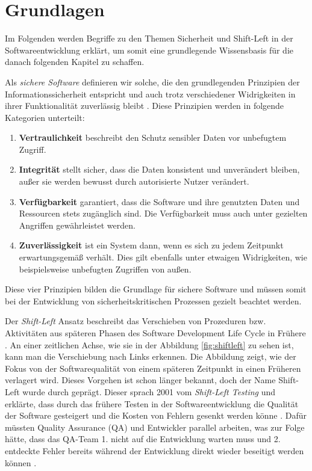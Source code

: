 \section{Grundlagen}

Im Folgenden werden Begriffe zu den Themen Sicherheit und Shift-Left in der Softwareentwicklung erklärt, um somit eine grundlegende Wissensbasis für die danach folgenden Kapitel zu schaffen.

Als \textit{sichere Software} definieren wir solche, die den grundlegenden Prinzipien der Informationssicherheit \cite{blakley_information_2001} entspricht und auch trotz verschiedener Widrigkeiten in ihrer Funktionalität zuverlässig bleibt \cite{oueslati_literature_2015}. Diese Prinzipien werden in folgende Kategorien unterteilt:
\begin{enumerate}
    \item \textbf{Vertraulichkeit} beschreibt den Schutz sensibler Daten vor unbefugtem Zugriff.
    \item \textbf{Integrität} stellt sicher, dass die Daten konsistent und unverändert bleiben, außer sie werden bewusst durch autorisierte Nutzer verändert.
    \item \textbf{Verfügbarkeit} garantiert, dass die Software und ihre genutzten Daten und Ressourcen stets zugänglich sind. Die Verfügbarkeit muss auch unter gezielten Angriffen gewährleistet werden.
    \item \textbf{Zuverlässigkeit} ist ein System dann, wenn es sich zu jedem Zeitpunkt erwartungsgemäß verhält. Dies gilt ebenfalls unter etwaigen Widrigkeiten, wie beispielsweise unbefugten Zugriffen von außen.
\end{enumerate}
Diese vier Prinzipien bilden die Grundlage für sichere Software und müssen somit bei der Entwicklung von sicherheitskritischen Prozessen gezielt beachtet werden.\

Der \textit{Shift-Left} Ansatz beschreibt das Verschieben von Prozeduren bzw. Aktivitäten aus späteren Phasen des Software Development Life Cycle in Frühere \cite{andriadi_impact_2023}. An einer zeitlichen Achse, wie sie in der Abbildung \ref{fig:shiftleft} zu sehen ist, kann man die Verschiebung nach Links erkennen. Die Abbildung zeigt, wie der Fokus von der Softwarequalität von einem späteren Zeitpunkt in einen Früheren verlagert wird. Dieses Vorgehen ist schon länger bekannt, doch der Name Shift-Left wurde durch \citet{smith_shift-left_2001} geprägt. Dieser sprach 2001 vom \textit{Shift-Left Testing} und erklärte, dass durch das frühere Testen in der Softwareentwicklung die Qualität der Software gesteigert und die Kosten von Fehlern gesenkt werden könne \cite{dawoud_better_2024}. Dafür müssten Quality Assurance (QA) und Entwickler parallel arbeiten, was zur Folge hätte, dass das QA-Team 1. nicht auf die Entwicklung warten muss und 2. entdeckte Fehler bereits während der Entwicklung direkt wieder beseitigt werden können \cite{andriadi_impact_2023}. 

